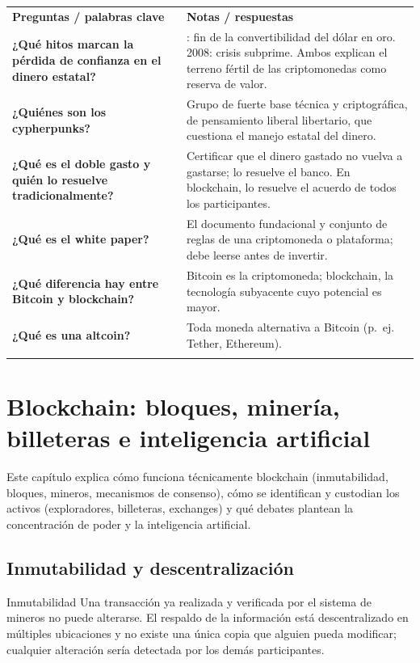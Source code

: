 \documentclass[12pt,oneside]{book}
\newcommand{\cq}[1]{\textbf{#1}}
\newcommand{\cornell}[3]{%
  \par\medskip\noindent\begingroup
  \renewcommand{\arraystretch}{1.25}%
  \begin{tabularx}{\textwidth}{|>{\raggedright\arraybackslash}p{0.27\textwidth}|>{\raggedright\arraybackslash}X|}
    \hline
    \multicolumn{2}{|>{\centering\arraybackslash}X|}{\cellcolor{azulacad!12}\textbf{Cuadro Cornell --- #1}}\\ \hline
    \cellcolor{gray!10}\textbf{Preguntas / palabras clave} & \cellcolor{gray!10}\textbf{Notas / respuestas} \\ \hline
    #2
    \multicolumn{2}{|>{\raggedright\arraybackslash}X|}{\cellcolor{azulacad!6}\textbf{Resumen.} #3}\\ \hline
  \end{tabularx}%
  \endgroup\par\medskip}
\begin{document}
\cornell{Del quiebre de la confianza a Bitcoin}{
\cq{¿Qué hitos marcan la pérdida de confianza en el dinero estatal?} & 1971: fin de la convertibilidad del dólar en oro. 2008: crisis subprime. Ambos explican el terreno fértil de las criptomonedas como reserva de valor. \\ \hline
\cq{¿Quiénes son los cypherpunks?} & Grupo de fuerte base técnica y criptográfica, de pensamiento liberal libertario, que cuestiona el manejo estatal del dinero. \\ \hline
\cq{¿Qué es el doble gasto y quién lo resuelve tradicionalmente?} & Certificar que el dinero gastado no vuelva a gastarse; lo resuelve el banco. En blockchain, lo resuelve el acuerdo de todos los participantes. \\ \hline
\cq{¿Qué es el white paper?} & El documento fundacional y conjunto de reglas de una criptomoneda o plataforma; debe leerse antes de invertir. \\ \hline
\cq{¿Qué diferencia hay entre Bitcoin y blockchain?} & Bitcoin es la criptomoneda; blockchain, la tecnología subyacente cuyo potencial es mayor. \\ \hline
\cq{¿Qué es una altcoin?} & Toda moneda alternativa a Bitcoin (p.~ej. Tether, Ethereum). \\ \hline
}{La pérdida de confianza en el dinero estatal y el pensamiento cypherpunk dieron origen a Bitcoin, que resuelve el doble gasto con un registro distribuido. Bitcoin es la moneda y blockchain la tecnología; el white paper fija las reglas y debe leerse siempre antes de invertir.}

\chapter{Blockchain: bloques, minería, billeteras e inteligencia artificial}
\label{cap:blockchain}

Este capítulo explica cómo funciona técnicamente blockchain (inmutabilidad, bloques, mineros, mecanismos de consenso), cómo se identifican y custodian los activos (exploradores, billeteras, exchanges) y qué debates plantean la concentración de poder y la inteligencia artificial.

\section{Inmutabilidad y descentralización}

\begin{definition}{Inmutabilidad}
Una transacción ya realizada y verificada por el sistema de mineros no puede alterarse. El respaldo de la información está descentralizado en múltiples ubicaciones y no existe una única copia que alguien pueda modificar; cualquier alteración sería detectada por los demás participantes.
\end{definition}
\end{document}
